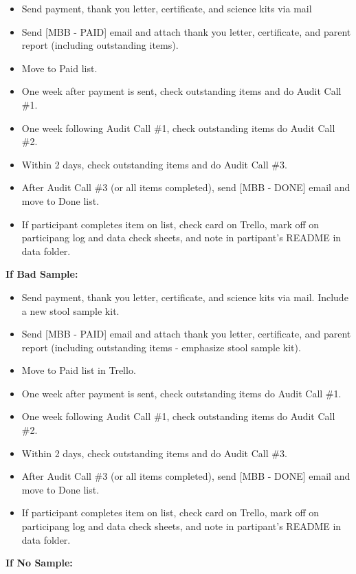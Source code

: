 \documentclass[]{book}
\providecommand{\tightlist}{%
  \setlength{\itemsep}{0pt}\setlength{\parskip}{0pt}}
\begin{document}
\begin{itemize}
\tightlist
\item
  Send payment, thank you letter, certificate, and science kits via mail
\item
  Send {[}MBB - PAID{]} email and attach thank you letter, certificate, and parent report (including outstanding items).
\item
  Move to Paid list.
\item
  One week after payment is sent, check outstanding items and do Audit Call \#1.
\item
  One week following Audit Call \#1, check outstanding items do Audit Call \#2.
\item
  Within 2 days, check outstanding items and do Audit Call \#3.
\item
  After Audit Call \#3 (or all items completed), send {[}MBB - DONE{]} email and move to Done list.
\item
  If participant completes item on list, check card on Trello, mark off on participang log and data check sheets, and note in partipant's README in data folder.
\end{itemize}

\textbf{If Bad Sample:}

\begin{itemize}
\tightlist
\item
  Send payment, thank you letter, certificate, and science kits via mail. Include a new stool sample kit.
\item
  Send {[}MBB - PAID{]} email and attach thank you letter, certificate, and parent report (including outstanding items - emphasize stool sample kit).
\item
  Move to Paid list in Trello.
\item
  One week after payment is sent, check outstanding items do Audit Call \#1.
\item
  One week following Audit Call \#1, check outstanding items do Audit Call \#2.
\item
  Within 2 days, check outstanding items and do Audit Call \#3.
\item
  After Audit Call \#3 (or all items completed), send {[}MBB - DONE{]} email and move to Done list.
\item
  If participant completes item on list, check card on Trello, mark off on participang log and data check sheets, and note in partipant's README in data folder.
\end{itemize}

\textbf{If No Sample:}
\end{document}
